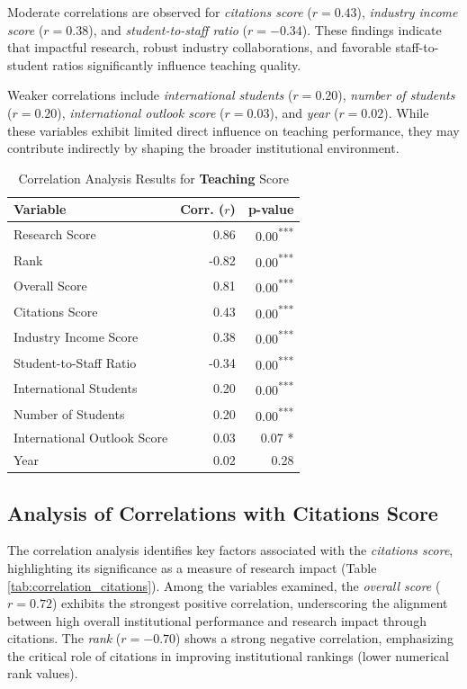 \documentclass[sigconf]{acmart}
\begin{document}
Moderate correlations are observed for \textit{citations score} ($r = 0.43$), \textit{industry income score} ($r = 0.38$), and \textit{student-to-staff ratio} ($r = -0.34$). These findings indicate that impactful research, robust industry collaborations, and favorable staff-to-student ratios significantly influence teaching quality.

Weaker correlations include \textit{international students} ($r = 0.20$), \textit{number of students} ($r = 0.20$), \textit{international outlook score} ($r = 0.03$), and \textit{year} ($r = 0.02$). While these variables exhibit limited direct influence on teaching performance, they may contribute indirectly by shaping the broader institutional environment.

\begin{table}[h!]
	\centering
	\caption{Correlation Analysis Results for \textbf{Teaching} Score}
	\label{tab:correlation_teaching}
	\begin{tabular}{|l|r|r|}
		\hline
		\textbf{Variable} & \textbf{Corr. ($r$)} & \textbf{p-value} \\
		\hline
		Research Score & 0.86 & 0.00\textsuperscript{***} \\
		Rank & -0.82 & 0.00\textsuperscript{***} \\
		Overall Score & 0.81 & 0.00\textsuperscript{***} \\
		Citations Score & 0.43 & 0.00\textsuperscript{***} \\
		Industry Income Score & 0.38 & 0.00\textsuperscript{***} \\
		Student-to-Staff Ratio & -0.34 & 0.00\textsuperscript{***} \\
		International Students & 0.20 & 0.00\textsuperscript{***} \\
		Number of Students & 0.20 & 0.00\textsuperscript{***} \\
		International Outlook Score & 0.03 & 0.07 * \\
		Year & 0.02 & 0.28 \\
		\hline
	\end{tabular}
\end{table}


\subsection{Analysis of Correlations with Citations Score}

The correlation analysis identifies key factors associated with the \textit{citations score}, highlighting its significance as a measure of research impact (Table \ref{tab:correlation_citations}). Among the variables examined, the \textit{overall score} ($r = 0.72$) exhibits the strongest positive correlation, underscoring the alignment between high overall institutional performance and research impact through citations. The \textit{rank} ($r = -0.70$) shows a strong negative correlation, emphasizing the critical role of citations in improving institutional rankings (lower numerical rank values).
\end{document}
